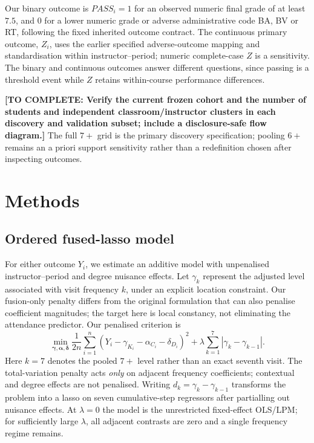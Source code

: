 \documentclass[11pt]{article}
\newcommand{\pending}[1]{\textbf{[TO COMPLETE: #1]}}
\begin{document}
Our binary outcome is $PASS_i=1$ for an observed numeric final grade of at least $7.5$, and $0$ for a lower numeric grade or adverse administrative code BA, BV or RT, following the fixed inherited outcome contract. The continuous primary outcome, $Z_i$, uses the earlier specified adverse-outcome mapping and standardisation within instructor--period; numeric complete-case $Z$ is a sensitivity. The binary and continuous outcomes answer different questions, since passing is a threshold event while $Z$ retains within-course performance differences.

\pending{Verify the current frozen cohort and the number of students and independent classroom/instructor clusters in each discovery and validation subset; include a disclosure-safe flow diagram.} The full $7+$ grid is the primary discovery specification; pooling $6+$ remains an a priori support sensitivity rather than a redefinition chosen after inspecting outcomes.

\section{Methods}
\subsection{Ordered fused-lasso model}
For either outcome $Y_i$, we estimate an additive model with unpenalised instructor--period and degree nuisance effects. Let $\gamma_k$ represent the adjusted level associated with visit frequency $k$, under an explicit location constraint. Our fusion-only penalty differs from the original formulation that can also penalise coefficient magnitudes; the target here is local constancy, not eliminating the attendance predictor. Our penalised criterion is
\begin{equation}
\min_{\boldsymbol\gamma,\boldsymbol\alpha,\boldsymbol\delta}
\frac{1}{2n}\sum_{i=1}^{n}
\left(Y_i-\gamma_{K_i}-\alpha_{C_i}-\delta_{D_i}\right)^2
+\lambda\sum_{k=1}^{7}|\gamma_k-\gamma_{k-1}|.
\label{eq:fusion}
\end{equation}
Here $k=7$ denotes the pooled $7+$ level rather than an exact seventh visit. The total-variation penalty acts \emph{only} on adjacent frequency coefficients; contextual and degree effects are not penalised. Writing $d_k=\gamma_k-\gamma_{k-1}$ transforms the problem into a lasso on seven cumulative-step regressors after partialling out nuisance effects. At $\lambda=0$ the model is the unrestricted fixed-effect OLS/LPM; for sufficiently large $\lambda$, all adjacent contrasts are zero and a single frequency regime remains.
\end{document}
